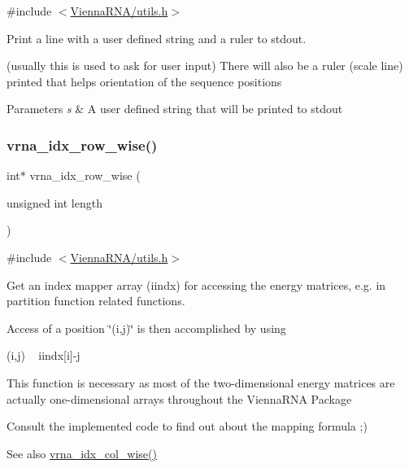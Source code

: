 {\ttfamily \#include $<$\hyperlink{utils_8h}{Vienna\+R\+N\+A/utils.\+h}$>$}



Print a line with a user defined string and a ruler to stdout. 

(usually this is used to ask for user input) There will also be a ruler (scale line) printed that helps orientation of the sequence positions


\begin{DoxyParams}{Parameters}
{\em s} & A user defined string that will be printed to stdout \\
\hline
\end{DoxyParams}
\mbox{\label{group__utils_ga70b180e9ea764218a82647a1cd347445}} 
\subsubsection{\texorpdfstring{vrna\+\_\+idx\+\_\+row\+\_\+wise()}{vrna\_idx\_row\_wise()}}
{\footnotesize\ttfamily int$\ast$ vrna\+\_\+idx\+\_\+row\+\_\+wise (\begin{DoxyParamCaption}\item[{unsigned int}]{length }\end{DoxyParamCaption})}



{\ttfamily \#include $<$\hyperlink{utils_8h}{Vienna\+R\+N\+A/utils.\+h}$>$}



Get an index mapper array (iindx) for accessing the energy matrices, e.\+g. in partition function related functions. 

Access of a position \char`\"{}(i,j)\char`\"{} is then accomplished by using\begin{DoxyVerb}(i,j) ~ iindx[i]-j \end{DoxyVerb}
 This function is necessary as most of the two-\/dimensional energy matrices are actually one-\/dimensional arrays throughout the Vienna\+R\+NA Package

Consult the implemented code to find out about the mapping formula ;)

\begin{DoxySeeAlso}{See also}
\hyperlink{group__utils_ga89ebc69c52fa0c78c9e1974b0017746b}{vrna\+\_\+idx\+\_\+col\+\_\+wise()} 
\end{DoxySeeAlso}

